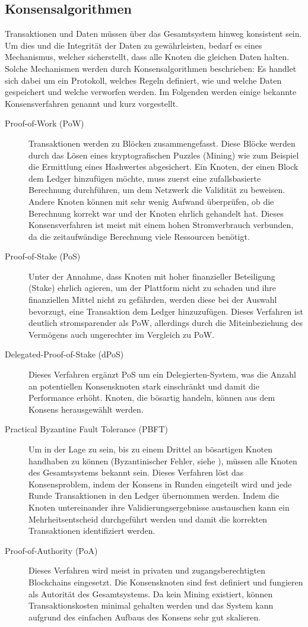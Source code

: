 \subsection{Konsensalgorithmen}
\label{subsec:fundamentals:dlt:consensus}
Transaktionen und Daten müssen über das Gesamtsystem hinweg konsistent sein. Um dies und die Integrität der Daten zu gewährleisten, bedarf es eines Mechanismus, welcher sicherstellt, dass alle Knoten die gleichen Daten halten. Solche Mechanismen werden durch Konsensalgorithmen beschrieben: Es handlet sich dabei um ein Protokoll, welches Regeln definiert, wie und welche Daten gespeichert und welche verworfen werden. Im Folgenden werden einige bekannte Konsensverfahren genannt und kurz vorgestellt.
\begin{description}
  \item[Proof-of-Work (PoW)] Transaktionen werden zu Blöcken zusammengefasst. Diese Blöcke werden durch das Lösen eines kryptografischen Puzzles (Mining) wie zum Beispiel die Ermittlung eines Hashwertes abgesichert. Ein Knoten, der einen Block dem Ledger hinzufügen möchte, muss zuerst eine zufallsbasierte Berechnung durchführen, um dem Netzwerk die Validität zu beweisen. Andere Knoten können mit sehr wenig Aufwand überprüfen, ob die Berechnung korrekt war und der Knoten ehrlich gehandelt hat. Dieses Konsensverfahren ist meist mit einem hohen Stromverbrauch verbunden, da die zeitaufwändige Berechnung viele Ressourcen benötigt.
  \item[Proof-of-Stake (PoS)] Unter der Annahme, dass Knoten mit hoher finanzieller Beteiligung (Stake) ehrlich agieren, um der Plattform nicht zu schaden und ihre finanziellen Mittel nicht zu gefährden, werden diese bei der Auswahl bevorzugt, eine Transaktion dem Ledger hinzuzufügen. Dieses Verfahren ist deutlich stromsparender als PoW, allerdings durch die Miteinbeziehung des Vermögens auch ungerechter im Vergleich zu PoW.
  \item[Delegated-Proof-of-Stake (dPoS)] Dieses Verfahren ergänzt PoS um ein Delegierten-System, was die Anzahl an potentiellen Konsensknoten stark einschränkt und damit die Performance erhöht. Knoten, die bösartig handeln, können aus dem Konsens herausgewählt werden.
  \item[Practical Byzantine Fault Tolerance (PBFT)] Um in der Lage zu sein, bis zu einem Drittel an bösartigen Knoten handhaben zu können (Byzantinischer Fehler, siehe \cite{XYZ}), müssen alle Knoten des Gesamtsystems bekannt sein. Dieses Verfahren löst das Konsensproblem, indem der Konsens in Runden eingeteilt wird und jede Runde Transaktionen in den Ledger übernommen werden. Indem die Knoten untereinander ihre Validierungsergebnisse austauschen kann ein Mehrheitsentscheid durchgeführt werden und damit die korrekten Transaktionen identifiziert werden.
  \item[Proof-of-Authority (PoA)] Dieses Verfahren wird meist in privaten und zugangsberechtigten Blockchains eingesetzt. Die Konsensknoten sind fest definiert und fungieren als Autorität des Gesamtsystems. Da kein Mining existiert, können Transaktionskosten minimal gehalten werden und das System kann aufgrund des einfachen Aufbaus des Konsens sehr gut skalieren.
\end{description}
